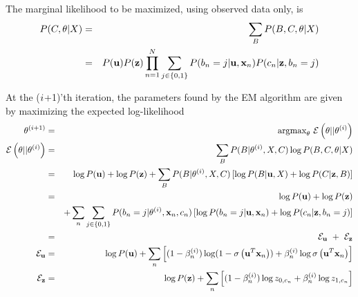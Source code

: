 \documentclass{article}
\begin{document}
The marginal likelihood to be maximized, using observed data only, is
\begin{eqnarray*}
  P(C,\theta|X) & = & \sum_{B} P(B,C,\theta|X) \\
  & = & P({\bf u}) P({\bf z}) \prod_{n=1}^{N} \sum_{j \in \{0,1\}} P(b_{n}=j|{\bf u},{\bf x}_{n}) P(c_{n}|{\bf z},b_{n}=j)
\end{eqnarray*}

At the ($i$+1)'th iteration, the parameters found by the EM algorithm are given by maximizing the expected log-likelihood
\begin{eqnarray*}
  \emparams^{(\emiteration+1)}
  & = &
  \argmax_{\emparams}\ 
  \emobjective\left(\emparams||\emparams^{(\emiteration)}\right)
  \\
  \emobjective\left(\emparams||\emparams^{(\emiteration)}\right)
  & = & 
  \sum_{\missing} P(\missing | \emparams^{(\emiteration)}, \allrealdata, \allcatlabels) \log P(\missing,\allcatlabels,\emparams|\allrealdata)
  \\
  & = & 
  \log P(\weights) + \log P(\labelerrprobs)
  + \sum_{\missing} P(\missing | \emparams^{(\emiteration)}, \allrealdata, \allcatlabels) \left[ \log P(\missing| \weights, \allrealdata) + \log P(\allcatlabels|\labelerrprobs,\missing) \right]
  \\
  & = & 
  \log P(\weights) + \log P(\labelerrprobs)
  \\ & &
  + \sum_{\datapoint} \sum_{\binlabelindex \in \{0,1\}} P(\binlabel_{\datapoint} = \binlabelindex | \emparams^{(\emiteration)}, \realdata_{\datapoint}, \catlabel_{\datapoint}) \left[ \log P(\binlabel_{\datapoint} = \binlabelindex | \weights, \realdata_{\datapoint}) + \log P(\catlabel_{\datapoint}|\labelerrprobs,\binlabel_{\datapoint}=\binlabelindex) \right]
  \\ & = &
  \emobjective_{\weights}\ +\ \emobjective_{\labelerrprobs}
  \\
  \emobjective_{\weights}
  & = &
  \log P(\weights)
  + \sum_{\datapoint} \left[ (1-\postprob) \log (1 - \logistic{\transpose{\weights} \realdata_{\datapoint}})
  + \postprob \log \logistic{\transpose{\weights} \realdata_{\datapoint}} \right]
  \\
  \emobjective_{\labelerrprobs}
  & = &
  \log P(\labelerrprobs)
  + \sum_{\datapoint} \left[ (1-\postprob) \log \labelerrprob_{0,\catlabel_{\datapoint}} + \postprob \log \labelerrprob_{1,\catlabel_{\datapoint}} \right]

\end{eqnarray*}
\end{document}
